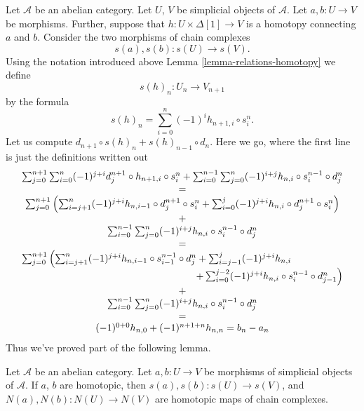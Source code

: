 \noindent
Let $\mathcal{A}$ be an abelian category.
Let $U$, $V$ be simplicial objects of $\mathcal{A}$.
Let $a, b : U \to V$ be morphisms. Further, suppose
that $h : U \times \Delta[1] \to V$ is a homotopy
connecting $a$ and $b$. Consider the two morphisms
of chain complexes
$$
s(a), s(b) : s(U) \longrightarrow s(V).
$$
Using the notation introduced above Lemma \ref{lemma-relations-homotopy}
we define
$$
s(h)_n : U_n \longrightarrow V_{n + 1}
$$
by the formula
$$
s(h)_n = \sum_{i = 0}^n (-1)^i h_{n + 1, i} \circ s^n_i.
$$
Let us compute $d_{n + 1} \circ s(h)_n + s(h)_{n - 1} \circ d_n$.
Here we go, where the first line is just the definitions
written out
$$
\begin{matrix}
\sum_{j = 0}^{n + 1} \sum_{i = 0}^n 
(-1)^{j + i} d^{n + 1}_j \circ h_{n + 1, i} \circ s^n_i
+ 
\sum_{i = 0}^{n - 1} \sum_{j = 0}^n
(-1)^{i + j} h_{n, i} \circ s^{n - 1}_i \circ d^n_j \\
= \\
\sum_{j = 0}^{n + 1}
\left(
\sum_{i = j + 1}^n
(-1)^{j + i} h_{n, i - 1} \circ d^{n + 1}_j \circ s^n_i
+
\sum_{i = 0}^j 
(-1)^{j + i} h_{n, i} \circ d^{n + 1}_j \circ s^n_i
\right) \\
+ \\
\sum_{i = 0}^{n - 1} \sum_{j = 0}^n
(-1)^{i + j} h_{n, i} \circ s^{n - 1}_i \circ d^n_j \\
= \\
\sum_{j = 0}^{n + 1}
\left(
\sum_{i = j + 1}^n
(-1)^{j + i} h_{n, i - 1} \circ s^{n - 1}_{i - 1} \circ d^n_j
+
\sum_{i = j - 1}^j 
(-1)^{j + i} h_{n, i} \right.\hfill\\
\hfill\left.
+
\sum_{i = 0}^{j - 2}
(-1)^{j + i} h_{n, i} \circ s^{n - 1}_i \circ d^n_{j - 1}
\right) \\
+ \\
\sum_{i = 0}^{n - 1} \sum_{j = 0}^n
(-1)^{i + j} h_{n, i} \circ s^{n - 1}_i \circ d^n_j \\
= \\
(-1)^{0 + 0} h_{n , 0} + (-1)^{n + 1 + n} h_{n, n} = b_n - a_n
\end{matrix}
$$
Thus we've proved part of the following lemma.

\begin{lemma}
\label{lemma-homotopy-s-N}
Let $\mathcal{A}$ be an abelian category.
Let $a, b : U \to V$ be morphisms of simplicial
objects of $\mathcal{A}$. If $a$, $b$ are homotopic,
then $s(a), s(b) : s(U) \to s(V)$, and
$N(a), N(b) : N(U) \to N(V)$ are homotopic maps
of chain complexes.
\end{lemma}

